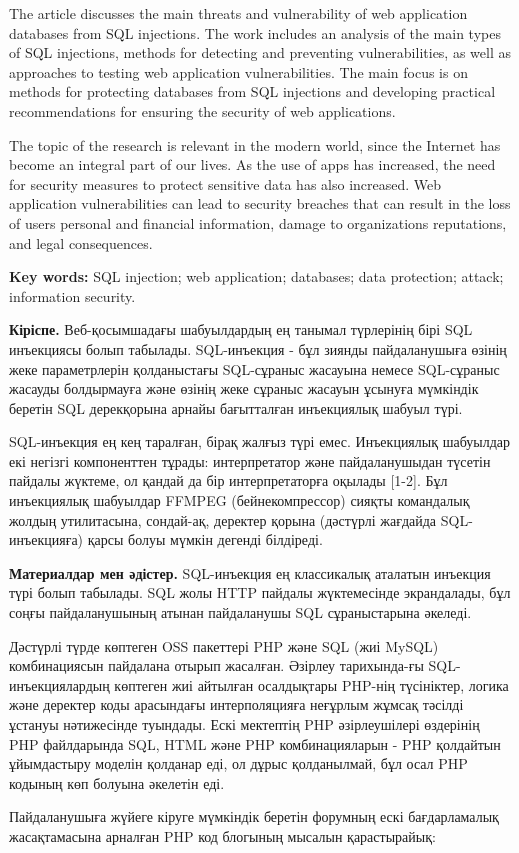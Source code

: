 The article discusses the main threats and vulnerability of web
application databases from SQL injections. The work includes an analysis
of the main types of SQL injections, methods for detecting and
preventing vulnerabilities, as well as approaches to testing web
application vulnerabilities. The main focus is on methods for protecting
databases from SQL injections and developing practical recommendations
for ensuring the security of web applications.

The topic of the research is relevant in the modern world, since the
Internet has become an integral part of our lives. As the use of apps
has increased, the need for security measures to protect sensitive data
has also increased. Web application vulnerabilities can lead to security
breaches that can result in the loss of users\textquotesingle{} personal
and financial information, damage to organizations\textquotesingle{}
reputations, and legal consequences.

{\bfseries Key words:} SQL injection; web application; databases; data
protection; attack; information security.
\begin{multicols}{2}

{\bfseries Кіріспе.} Веб-қосымшадағы шабуылдардың ең танымал түрлерінің
бірі SQL инъекциясы болып табылады. SQL-инъекция - бұл зиянды
пайдаланушыға өзінің жеке параметрлерін қолданыстағы SQL-сұраныс
жасауына немесе SQL-сұраныс жасауды болдырмауға және өзінің жеке сұраныс
жасауын ұсынуға мүмкіндік беретін SQL дерекқорына арнайы бағытталған
инъекциялық шабуыл түрі.

SQL-инъекция ең кең таралған, бірақ жалғыз түрі емес. Инъекциялық
шабуылдар екі негізгі компоненттен тұрады: интерпретатор және
пайдаланушыдан түсетін пайдалы жүктеме, ол қандай да бір интерпретаторға
оқылады {[}1-2{]}. Бұл инъекциялық шабуылдар FFMPEG (бейнекомпрессор)
сияқты командалық жолдың утилитасына, сондай-ақ, деректер қорына
(дәстүрлі жағдайда SQL-инъекцияға) қарсы болуы мүмкін дегенді білдіреді.

{\bfseries Материалдар мен әдістер.} SQL-инъекция ең классикалық аталатын
инъекция түрі болып табылады. SQL жолы HTTP пайдалы жүктемесінде
экрандалады, бұл соңғы пайдаланушының атынан пайдаланушы SQL
сұраныстарына әкеледі.

Дәстүрлі түрде көптеген OSS пакеттері PHP және SQL (жиі MySQL)
комбинациясын пайдалана отырып жасалған. Әзірлеу тарихында-ғы
SQL-инъекциялардың көптеген жиі айтылған осалдықтары PHP-нің түсініктер,
логика және деректер коды арасындағы интерполяцияға неғұрлым жұмсақ
тәсілді ұстануы нәтижесінде туындады. Ескі мектептің PHP әзірлеушілері
өздерінің PHP файлдарында SQL, HTML және PHP комбинацияларын - PHP
қолдайтын ұйымдастыру моделін қолданар еді, ол дұрыс қолданылмай, бұл
осал PHP кодының көп болуына әкелетін еді.

Пайдаланушыға жүйеге кіруге мүмкіндік беретін форумның ескі
бағдарламалық жасақтамасына арналған PHP код блогының мысалын
қарастырайық:
\end{multicols}


